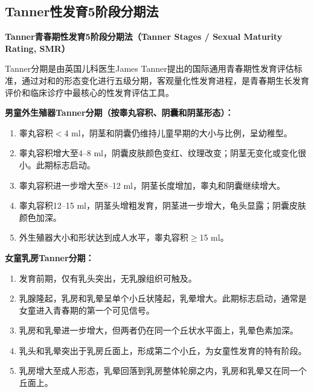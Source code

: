 \subsection{Tanner性发育5阶段分期法}

\begin{keybox}
\textbf{Tanner青春期性发育5阶段分期法（Tanner Stages / Sexual Maturity Rating, SMR）}

Tanner分期是由英国儿科医生James Tanner提出的国际通用青春期性发育评估标准，通过对和的形态变化进行五级分期，客观量化性发育进程，是青春期生长发育评价和临床诊疗中最核心的性发育评估工具。

\textbf{男童外生殖器Tanner分期（按睾丸容积、阴囊和阴茎形态）：}
\begin{enumerate}[leftmargin=*]
    \item {}睾丸容积$<$4 ml，阴茎和阴囊仍维持儿童早期的大小与比例，呈幼稚型。
    \item {}睾丸容积增大至4--8 ml，阴囊皮肤颜色变红、纹理改变；阴茎无变化或变化很小。此期标志启动。
    \item {}睾丸容积进一步增大至8--12 ml，阴茎长度增加，睾丸和阴囊继续增大。
    \item {}睾丸容积12--15 ml，阴茎头增粗发育，阴茎进一步增大，龟头显露；阴囊皮肤颜色加深。
    \item {}外生殖器大小和形状达到成人水平，睾丸容积$\geq$15 ml。
\end{enumerate}

\textbf{女童乳房Tanner分期：}
\begin{enumerate}[leftmargin=*]
    \item {}发育前期，仅有乳头突出，无乳腺组织可触及。
    \item {}乳腺隆起，乳房和乳晕呈单个小丘状隆起，乳晕增大。此期标志启动，通常是女童进入青春期的第一个可见信号。
    \item {}乳房和乳晕进一步增大，但两者仍在同一个丘状水平面上，乳晕色素加深。
    \item {}乳头和乳晕突出于乳房丘面上，形成第二个小丘，为女童性发育的特有阶段。
    \item {}乳房增大至成人形态，乳晕回落到乳房整体轮廓之内，乳房和乳晕又在同一个丘面上。
\end{enumerate}


\end{keybox}
